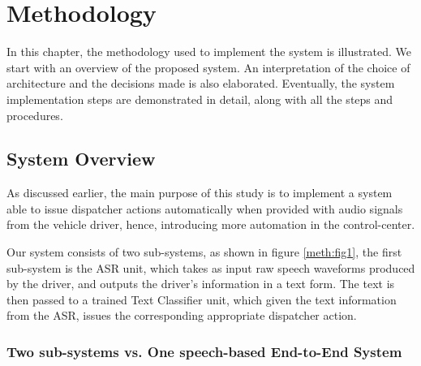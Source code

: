 \chapter{Methodology}
\label{chap:methodology}

 \hypersetup{
	colorlinks=false,
	linkcolor=black,
	filecolor=black,
	citecolor = blue,      
	urlcolor=cyan,
}

In this chapter, the methodology used to implement the system is illustrated. We start with an overview of the proposed system. An interpretation of the choice of architecture and the decisions made is also elaborated. Eventually, the system implementation steps are demonstrated in detail, along with all the steps and procedures.




\section{System Overview} 
\label{meth:s1}

As discussed earlier, the main purpose of this study is to implement a system able to issue dispatcher actions automatically when provided with audio signals from the vehicle driver, hence, introducing more automation in the control-center. 

Our system consists of two sub-systems, as shown in figure \ref{meth:fig1}, the first sub-system is the \acf{ASR} unit, which takes as input raw speech waveforms produced by the driver, and outputs the driver's information in a text form. The text is then passed to a trained Text Classifier unit, which given the text information from the \ac{ASR}, issues the corresponding appropriate dispatcher action.

\subsection{Two sub-systems vs. One speech-based End-to-End System}
\label{meth:s1_sub1}

